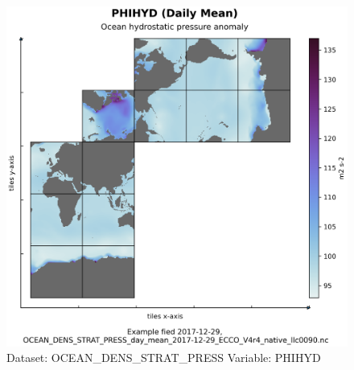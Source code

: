 \begin{figure}[H]
\centering
\includegraphics[width=\textwidth]{../images/plots/native_plots/Ocean_Density_Stratification_and_Hydrostatic_Pressure/PHIHYD.png}
\caption{Dataset: OCEAN\_DENS\_STRAT\_PRESS Variable: PHIHYD}
\label{tab:table-OCEAN_DENS_STRAT_PRESS_PHIHYD-Plot}
\end{figure}
\pagebreak
